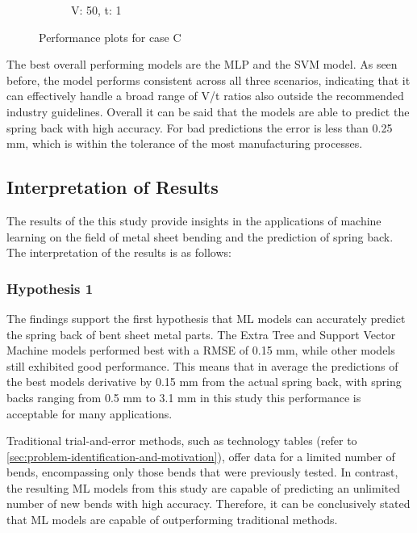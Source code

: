 \begin{figure}[h]
\begin{tcolorbox}[arc=0pt,boxrule=0.5pt]
\begin{subfigure}{0.5\textwidth}
            \caption{V: 50, t: 1}
            \label{fig:performance-50_1}
        \end{subfigure}
    \end{tcolorbox}
    \caption{Performance plots for case C}
    \label{fig:performance-case-c}
\end{figure}

The best overall performing models are the \ac{MLP} and the \ac{SVM} model.
As seen before, the model performs consistent across all three scenarios, indicating that it can
effectively handle a broad range of V/t ratios also outside the recommended industry guidelines.
Overall it can be said that the models are able to predict the spring back with high accuracy.
For bad predictions the error is less than 0.25 mm, which is within the tolerance of the
most manufacturing processes.

\subsection{Interpretation of Results}\label{subsec:interpretation-of-results}

The results of the this study provide insights in the applications of machine learning on the field of metal sheet
bending and the prediction of spring back.
The interpretation of the results is as follows:

\subsubsection{Hypothesis 1}
The findings support the first hypothesis that \ac{ML} models can accurately predict the spring back of bent sheet
metal parts.
The Extra Tree and Support Vector Machine models performed best with a RMSE of 0.15 mm, while other models still
exhibited good performance.
This means that in average the predictions of the best models derivative by 0.15 mm from the actual spring back,
with spring backs ranging from 0.5 mm to 3.1 mm in this study this performance is acceptable for many applications.

Traditional trial-and-error methods, such as technology tables (refer to
\cref{sec:problem-identification-and-motivation}), offer data for a limited number of bends, encompassing
only those bends that were previously tested.
In contrast, the resulting \ac{ML} models from this study are capable of predicting an unlimited number of new bends
with high accuracy.
Therefore, it can be conclusively stated that \ac{ML} models are capable of outperforming traditional methods.

